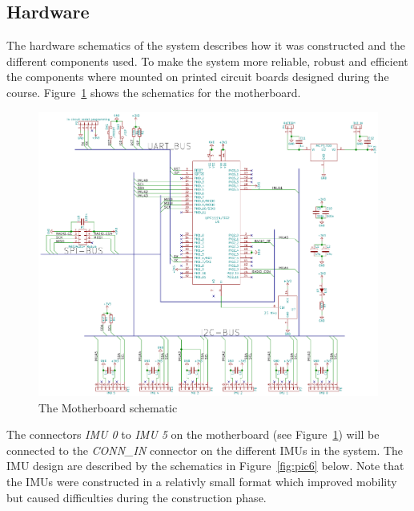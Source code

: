 \documentclass[a4paper, 12pt]{article}
\begin{document}
\subsection*{Hardware} %
The hardware schematics of the system describes how it was constructed and the different components used. To make the system more reliable, robust and efficient the components where mounted on printed circuit boards designed during the course. Figure~\ref{fig:pic5} shows the schematics for the motherboard.
 

\begin{figure}[h!] %
    \centering
    \includegraphics[scale=0.67]{mb_schematic.pdf}
    \caption{The Motherboard schematic}
    \label{fig:pic5}
\end{figure}

\noindent %
The connectors \textit{IMU 0} to \textit{IMU 5} on the motherboard (see Figure~\ref{fig:pic5}) will be connected to the \textit{CONN\_IN} connector on the different IMUs in the system. The IMU design are described by the schematics in Figure~\ref{fig:pic6} below. Note that the IMUs were constructed in a relativly small format which improved mobility but caused difficulties during the construction phase. %
 
\end{document}
